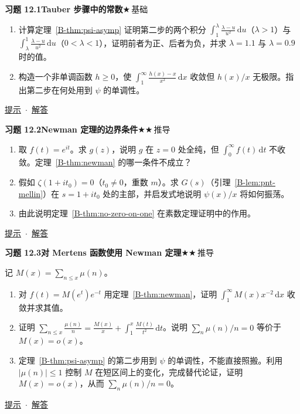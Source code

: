 \documentclass[11pt,a4paper]{article}
\newcommand{\dd}{\,\mathrm{d}}
\newcommand{\bref}[1]{\ref*{B-#1}}
\newcommand{\lvI}{$\bigstar$\,基础}
\newcommand{\lvII}{$\bigstar\bigstar$\,推导}
\newcommand{\Q}[3]{%
  \par\addvspace{1.1em}\noindent
  \hypertarget{q:#1}{}\textbf{习题 #1}\quad\textbf{#3}\hfill{\small #2}\par
  \nopagebreak\smallskip}
\newcommand{\toHint}[1]{\hfill{\small\hyperlink{h:#1}{提示}\ $\cdot$\ \hyperlink{s:#1}{解答}}}
\begin{document}
\Q{12.1}{\lvI}{Tauber 步骤中的常数}
\begin{enumerate}
  \item 计算定理~\bref{thm:psi-asymp} 证明第二步的两个积分 $\int_1^\lambda\frac{\lambda-u}{u^2}\dd u$（$\lambda>1$）与 $\int_\lambda^1\frac{\lambda-u}{u^2}\dd u$（$0<\lambda<1$），证明前者为正、后者为负，并求 $\lambda=1.1$ 与 $\lambda=0.9$ 时的值。
  \item 构造一个非单调函数 $h\ge0$，使 $\int_1^\infty\frac{h(x)-x}{x^2}\dd x$ 收敛但 $h(x)/x$ 无极限。指出第二步在何处用到 $\psi$ 的单调性。
\end{enumerate}
\toHint{12.1}

\Q{12.2}{\lvII}{Newman 定理的边界条件}
\begin{enumerate}
  \item 取 $f(t)=e^{it}$。求 $g(z)$，说明 $g$ 在 $z=0$ 处全纯，但 $\int_0^\infty f(t)\dd t$ 不收敛。定理~\bref{thm:newman} 的哪一条件不成立？
  \item 假如 $\zeta(1+it_0)=0$（$t_0\ne0$，重数 $m$）。求 $G(s)$（引理~\bref{lem:pnt-mellin}）在 $s=1+it_0$ 处的主部，并启发式地说明 $\psi(x)/x$ 将如何振荡。
  \item 由此说明定理~\bref{thm:no-zero-on-one} 在素数定理证明中的作用。
\end{enumerate}
\toHint{12.2}

\Q{12.3}{\lvII}{对 Mertens 函数使用 Newman 定理}
记 $M(x)=\sum_{n\le x}\mu(n)$。
\begin{enumerate}
  \item 对 $f(t)=M(e^t)e^{-t}$ 用定理~\bref{thm:newman}，证明 $\int_1^\infty M(x)x^{-2}\dd x$ 收敛并求其值。
  \item 证明 $\sum_{n\le x}\frac{\mu(n)}n=\frac{M(x)}x+\int_1^x\frac{M(t)}{t^2}\dd t$。说明 $\sum_n\mu(n)/n=0$ 等价于 $M(x)=o(x)$。
  \item 定理~\bref{thm:psi-asymp} 的第二步用到 $\psi$ 的单调性，不能直接照搬。利用 $|\mu(n)|\le1$ 控制 $M$ 在短区间上的变化，完成替代论证，证明 $M(x)=o(x)$，从而 $\sum_n\mu(n)/n=0$。
\end{enumerate}
\toHint{12.3}
\end{document}
